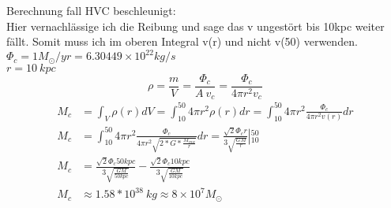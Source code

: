 Berechnung fall HVC beschleunigt:\\
Hier vernachlässige ich die Reibung und sage das v ungestört bis 10kpc weiter fällt. Somit muss ich im oberen Integral v(r) und nicht v(50) verwenden.\\
\(\Phi_{c} = 1M_\odot/yr = 6.30449\times 10^{22} kg/s\)\\
\(r=10~kpc\)
\begin{equation}
\rho = \frac{m}{V} = \frac{\Phi_{c}}{A~v_{c}} = \frac{\Phi_{c}}{4\pi r^2 v_{c}}
\end{equation}
\begin{align}
M_{c} &= \int_{V} \rho(r)dV = \int_{10}^{50} 4 \pi r^2 \rho(r) dr = \int_{10}^{50} 4 \pi r^2 \frac{\Phi_{c}}{4\pi r^2 v(r)} dr\\
M_{c} &= \int_{10}^{50} 4 \pi r^2 \frac{\Phi_{c}}{4\pi r^2 \sqrt{2*G*\frac{M_{mw}}{r}}} dr = \frac{\sqrt{2} \Phi_{c} r}{3 \sqrt{\frac{G M}{r}}}\left |_{10}^{50}\right.\nonumber\\
M_{c}&=\frac{\sqrt{2} \Phi_{c} 50kpc}{3 \sqrt{\frac{G M}{50kpc}}} - \frac{\sqrt{2} \Phi_{c} 10 kpc}{3 \sqrt{\frac{G M}{10kpc}}}\nonumber\\
M_{c}&\approx 1.58 * 10^{38}~kg\approx 8 \times 10^7 M_\odot
\end{align}
